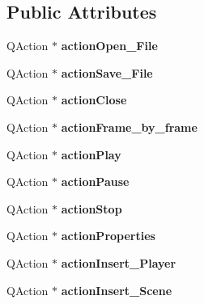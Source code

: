 \subsection*{Public Attributes}
\begin{DoxyCompactItemize}
\item 
\hypertarget{classUi__AceVal_a30174a042540dce12d3de018215d14fc}{Q\-Action $\ast$ {\bfseries action\-Open\-\_\-\-File}}\label{classUi__AceVal_a30174a042540dce12d3de018215d14fc}

\item 
\hypertarget{classUi__AceVal_a0bee4d733dfb7131f173b0c10471e5ea}{Q\-Action $\ast$ {\bfseries action\-Save\-\_\-\-File}}\label{classUi__AceVal_a0bee4d733dfb7131f173b0c10471e5ea}

\item 
\hypertarget{classUi__AceVal_a09b7bc348529e4e1284a6f51b12437c9}{Q\-Action $\ast$ {\bfseries action\-Close}}\label{classUi__AceVal_a09b7bc348529e4e1284a6f51b12437c9}

\item 
\hypertarget{classUi__AceVal_ab640e572260888564ec9fe82e48c500c}{Q\-Action $\ast$ {\bfseries action\-Frame\-\_\-by\-\_\-frame}}\label{classUi__AceVal_ab640e572260888564ec9fe82e48c500c}

\item 
\hypertarget{classUi__AceVal_a3a2142b903d7235d4c7686fae0461a0a}{Q\-Action $\ast$ {\bfseries action\-Play}}\label{classUi__AceVal_a3a2142b903d7235d4c7686fae0461a0a}

\item 
\hypertarget{classUi__AceVal_a766e2d4b27f3ef553fc202ad083c7488}{Q\-Action $\ast$ {\bfseries action\-Pause}}\label{classUi__AceVal_a766e2d4b27f3ef553fc202ad083c7488}

\item 
\hypertarget{classUi__AceVal_af71bf918dd405ef5986f164da7c3b7bf}{Q\-Action $\ast$ {\bfseries action\-Stop}}\label{classUi__AceVal_af71bf918dd405ef5986f164da7c3b7bf}

\item 
\hypertarget{classUi__AceVal_a76ec53c1bca70bd211add11284b04a87}{Q\-Action $\ast$ {\bfseries action\-Properties}}\label{classUi__AceVal_a76ec53c1bca70bd211add11284b04a87}

\item 
\hypertarget{classUi__AceVal_ad090150db9686388f1e0ab95a4f8c9d5}{Q\-Action $\ast$ {\bfseries action\-Insert\-\_\-\-Player}}\label{classUi__AceVal_ad090150db9686388f1e0ab95a4f8c9d5}

\item 
\hypertarget{classUi__AceVal_a2a2b8ceead337432a6237a3723eb60b7}{Q\-Action $\ast$ {\bfseries action\-Insert\-\_\-\-Scene}}\label{classUi__AceVal_a2a2b8ceead337432a6237a3723eb60b7}


\end{DoxyCompactItemize}
